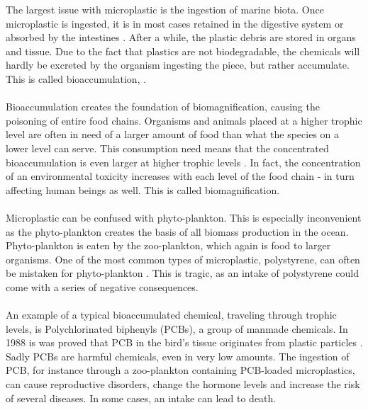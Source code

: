 The largest issue with microplastic is the ingestion of marine biota. Once microplastic is ingested, it is in most cases retained in the digestive system or absorbed by the intestines \cite{browne_galloway_thompson_2007}. After a while, the plastic debris are stored in organs and tissue. Due to the fact that plastics are not biodegradable, the chemicals will hardly be excreted by the organism ingesting the piece, but rather accumulate. This is called bioaccumulation, \cite{bart}. 
\\\\
Bioaccumulation creates the foundation of biomagnification, causing the poisoning of entire food chains. Organisms and animals placed at a higher trophic level are often in need of a larger amount of food than what the species on a lower level can serve. This consumption need means that the concentrated bioaccumulation is even larger at higher trophic levels \cite{maddison_carbery_wayne_o'connor_palanisami_thavamani_2018}. In fact, the concentration of an environmental toxicity increases with each level of the food chain - in turn affecting human beings as well. This is called biomagnification. 
\\\\
Microplastic can be confused with phyto-plankton. This is especially inconvenient as the phyto-plankton creates the basis of all biomass production in the ocean. Phyto-plankton is eaten by the zoo-plankton, which again is food to larger organisms. One of the most common types of microplastic, polystyrene, can often be mistaken for phyto-plankton \cite{sussarellu_suquet_2016}. This is tragic, as an intake of polystyrene could come with a series of negative consequences. %
\\\\
An example of a typical bioaccumulated chemical, traveling through trophic levels, is Polychlorinated biphenyls (PCBs), a group of manmade chemicals. In 1988 is was proved that PCB in the bird's tissue originates from plastic particles \cite{derraik_2002}. Sadly PCBs are harmful chemicals, even in very low amounts. The ingestion of PCB, for instance through a zoo-plankton containing PCB-loaded microplastics, can cause reproductive disorders, change the hormone levels and increase the risk of several diseases. In some cases, an intake can lead to death. %
\\\\
